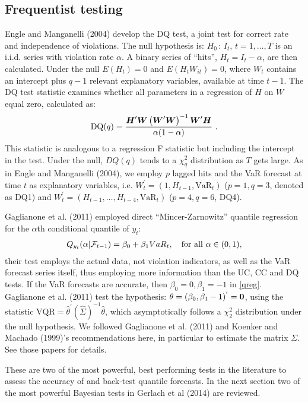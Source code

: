 \documentclass[12pt,epsf]{article}
\newcommand{\utwi}[1]{\mbox{\boldmath $ #1$}}
\newcommand{\calF}{{\cal F}}
\begin{document}
\subsection{Frequentist testing}
Engle and Manganelli (2004) develop the DQ test, a joint test for correct rate and independence of violations. The null hypothesis
is: $ H_{0} \,:\, I_t$, $t=1,\ldots,T$ is an i.i.d. series with violation rate $\alpha$. A binary series of ``hits'',
$H_t = I_{t}-\alpha$, are then calculated. Under the null $E(H_t) = 0$ and $E(H_tW_{it})=0$, where $W_t$ contains an intercept plus
$q-1$ relevant explanatory variables, available at time $t-1$. The DQ test statistic examines whether all
parameters in a regression of $H$ on $W$ equal zero, calculated as:
\begin{eqnarray*}
\mbox{DQ}(q) = \frac{\utwi{H}'\utwi{W}\left(\utwi{W}'\utwi{W}\right)^{-1}\utwi{W}'\utwi{H}}{\alpha(1-\alpha)} \,\,.
\end{eqnarray*}
This statistic is analogous to a regression F statistic but including the intercept in the test. Under the null,
$DQ(q)$ tends to a $\chi^2_q$ distribution as $T$ gets large.
As in Engle and Manganelli (2004), we employ $p$ lagged hits and the VaR forecast at time $t$ as explanatory variables,
i.e. $W_t^{'} = (1, H_{t-1}, \mbox{VaR}_{t})$ ($p=1, q=3$, denoted as DQ1) and $W_t^{'} = (H_{t-1}, \ldots, H_{t-4}, \mbox{VaR}_{t})$
($p=4, q=6$, DQ4).

Gaglianone et al. (2011) employed direct ``Mincer-Zarnowitz'' quantile regression for the $\alpha$th conditional quantile of $y_t$:
\begin{eqnarray}\label{qreg}
Q_{y_t } (\alpha |\calF_{t-1}  ) = \beta_0  + \beta_1 VaR_t, \quad{\textrm{for all }}\alpha  \in {\rm{(0,1)}},
\end{eqnarray}
their test employs the actual data, not violation indicators, as well as the VaR forecast series itself, thus employing more information
than the UC, CC and DQ tests. If the VaR forecasts are accurate, then $\beta _0  = 0, \beta _1  = -1$ in \ref{qreg}.
Gaglianone et al. (2011) test the hypothesis: $\theta= (\beta_0, \beta_1-1)^{'} = \bf{0}$, using the statistic
$\mbox{VQR} = \hat{\theta}^{'} \left(\hat{\Sigma} \right)^{-1} \hat{\theta}$,
which asymptotically follows a $\chi^2_2$ distribution under the null hypothesis. We followed Gaglianone et al. (2011) and
Koenker and Machado (1999)'s recommendations here, in particular to estimate the matrix $\Sigma$. See those papers for details.

These are two of the most powerful, best performing tests in the literature to assess the accuracy of and back-test quantile forecasts.
In the next section two of the most powerful Bayesian tests in Gerlach et al (2014) are reviewed.
\end{document}

